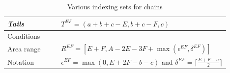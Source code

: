 \documentclass[11pt,reqno]{amsart}
\newcommand{\defn}[1]{{\color{darkred}\emph{#1}}} %
\theoremstyle{definition}
\numberwithin{equation}{section}
\begin{document}
\begin{table}[!h]
\caption{Various indexing sets for chains \label{table.indexing sets}}
\begin{tabularx}{\linewidth}{l|p{10cm}}
\toprule
\defn{Tails} & $\qquad T^{EF} = (a+b+c-E,b+c-F,c)$\\
\hline
Conditions & \vspace{-0.5cm}{
\begin{subequations}
\begin{align}
	&\hspace{-6.8cm}0 \leqslant F \leqslant c-\epsilon_{EF} \hspace{-1cm}\label{t1}\\
	&\hspace{-6.8cm}2\epsilon^{EF} \leqslant E \leqslant F+a \hspace{-1cm}\label{t2}\\
	&\hspace{-6.8cm}4E+5F-3\epsilon^{EF} \leqslant a+3b+3c \hspace{-1cm}\label{t3}
\end{align}
\end{subequations}}\\[-5mm]
\hline	        
Area range & $\qquad R^{EF}= [E+F ,A-2E-3F+ \max(\epsilon^{EF}, \delta^{EF})]$\\
\hline
Notation & $\qquad \epsilon^{EF} = \max(0,E+2F-b-c)$ and $\delta^{EF} = \lceil\frac{E+F-a}{2}\rceil $\\
\bottomrule
\end{tabularx}

\vspace{4mm}


\end{table}
\end{document}
